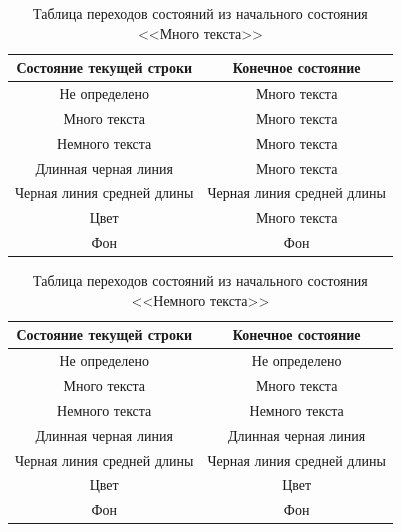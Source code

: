\begin{table}[H]
    \centering
    \caption{Таблица переходов состояний из начального состояния <<Много текста>>}
    \label{tab:many_text}
    \begin{tabular}{|c|c|}
        \hline
        \textbf{Состояние текущей строки} & \textbf{Конечное состояние} \\ \hline
        Не определено & Много текста \\ \hline
        Много текста & Много текста \\ \hline
        Немного текста & Много текста \\ \hline
        Длинная черная линия & Много текста \\ \hline
        Черная линия средней длины & Черная линия средней длины \\ \hline
        Цвет & Много текста \\ \hline
        Фон & Фон \\ \hline
    \end{tabular}
\end{table}

\begin{table}[H]
    \centering
    \caption{Таблица переходов состояний из начального состояния <<Немного текста>>}
    \label{tab:few_text}
    \begin{tabular}{|c|c|}
        \hline
        \textbf{Состояние текущей строки} & \textbf{Конечное состояние} \\ \hline
        Не определено & Не определено \\ \hline
        Много текста & Много текста \\ \hline
        Немного текста & Немного текста \\ \hline
        Длинная черная линия & Длинная черная линия \\ \hline
        Черная линия средней длины & Черная линия средней длины \\ \hline
        Цвет & Цвет \\ \hline
        Фон & Фон \\ \hline
    \end{tabular}
\end{table}

